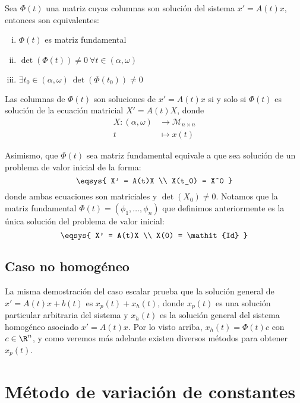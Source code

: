 \documentclass[../main.tex]{subfiles}
\begin{document}
\begin{corollary}
  Sea \(\Phi(t)\) una matriz cuyas columnas son solución del sistema
  \(x' = A(t)x\), entonces son equivalentes:

  \begin{enumerate}[i)]
  \item \(\Phi(t)\) es matriz fundamental
  \item \(\det(\Phi(t)) \neq 0 \ \forall t \in (\alpha, \omega)\)
  \item \(\exists t_0 \in (\alpha, \omega) \ \det(\Phi(t_0)) \neq 0\)
  \end{enumerate}
\end{corollary}

Las columnas de \(\Phi(t)\) son soluciones de \(x' = A(t)x\) si y solo si
\(\Phi(t)\) es solución de la ecuación matricial \(X' = A(t)X\), donde
\begin{align*}
	X : (\alpha, \omega) &\to \mathcal{M}_{n \times n} \\
	t &\mapsto x(t)
\end{align*}

Asimismo, que \(\Phi(t)\) sea matriz fundamental equivale a que sea solución de
un problema de valor inicial de la forma:
\[\eqsys{
	X' = A(t)X \\
	X(t_0) = X^0
}\]
donde ambas ecuaciones son matriciales y \(\det(X_0) \neq 0\). Notamos que la
matriz fundamental \(\Phi(t) = (\phi_1, \dots, \phi_n)\) que definimos
anteriormente es la única solución del problema de valor inicial:
\[\eqsys{
	X' = A(t)X \\
	X(0) = \mathit{Id}
	}\]

\subsection{Caso no homogéneo}

La misma demostración del caso escalar prueba que la solución general de
\(x' = A(t)x + b(t)\) es \(x_p(t) + x_h(t)\), donde \(x_p(t)\) es una solución
particular arbitraria del sistema y \(x_h(t)\) es la solución general del
sistema homogéneo asociado \(x' = A(t)x\). Por lo visto arriba,
\(x_h(t) = \Phi(t)c\) con \(c \in \R^n\), y como veremos más adelante existen
diversos métodos para obtener \(x_p(t)\).

\section{Método de variación de constantes}
\end{document}

